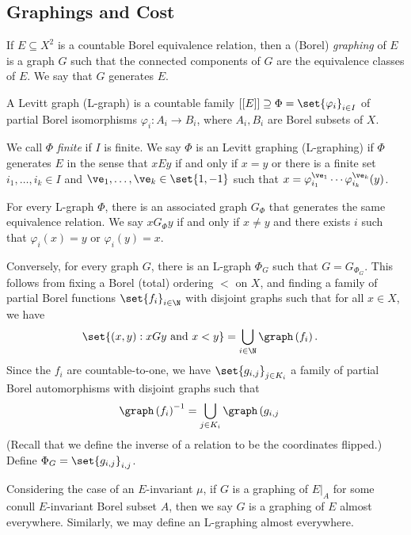 \documentclass[10pt]{mypackage}
\begin{document}
\subsection{Graphings and Cost}%
\begin{definition}
  If $E\subseteq X^2$ is a countable Borel equivalence relation, then a (Borel) \textit{graphing} of $E$ is a graph $ G $ such that the connected components of $G$ are the equivalence classes of $E$. We say that $G$ generates $E$.
\end{definition}
\begin{definition}
  A Levitt graph (L-graph) is a countable family $ \left[ \left[ E \right] \right]\supseteq \Phi=\set{\varphi_i}_{i\in I}$ of partial Borel isomorphisms $\varphi_i\colon A_i\rightarrow B_i$, where $A_i,B_i$ are Borel subsets of $X$.

  We call $\Phi$ \textit{finite} if $I$ is finite. We say $\Phi$ is an Levitt graphing (L-graphing) if $\Phi$ generates $E$ in the sense that $xEy$ if and only if $x = y$ or there is a finite set $i_1,\dots,i_k\in I$ and $\ve_1,\dots,\ve_k\in \set{1,-1}$ such that $x = \varphi_{i_1}^{\ve_1}\cdots \varphi_{i_k}^{\ve_k}(y)$.
\end{definition}
For every L-graph $\Phi$, there is an associated graph $G_{\Phi}$ that generates the same equivalence relation. We say $xG_{\Phi}y$ if and only if $x\neq y$ and there exists $i$ such that $\varphi_i(x) = y$ or $\varphi_i(y) = x$.

Conversely, for every graph $G$, there is an L-graph $\Phi_G$ such that $G = G_{\Phi_G}$. This follows from fixing a Borel (total) ordering $<$ on $X$, and finding a family of partial Borel functions $\set{f_i}_{i\in \N}$ with disjoint graphs such that for all $x\in X$, we have
\begin{align*}
  \set{\left( x,y \right) : xGy\text{ and }x < y} &= \bigcup_{i\in \N}\graph\left( f_i \right).
\end{align*}
Since the $f_i$ are countable-to-one, we have $\set{g_{i,j}}_{j\in K_i}$ a family of partial Borel automorphisms with disjoint graphs such that
\begin{align*}
  \graph\left( f_i \right)^{-1}&= \bigcup_{j\in K_i} \graph\left( g_{i,j} \right.
\end{align*}
(Recall that we define the inverse of a relation to be the coordinates flipped.) Define $\Phi_G = \set{g_{i,j}}_{i,j}$.

Considering the case of an $E$-invariant $\mu$, if $G$ is a graphing of $E|_{A}$ for some conull $E$-invariant Borel subset $A$, then we say $G$ is a graphing of $E$ almost everywhere. Similarly, we may define an L-graphing almost everywhere.
\end{document}
